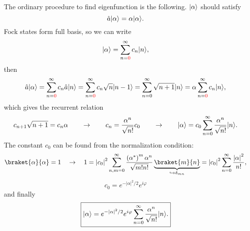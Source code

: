 The ordinary procedure to find eigenfunction is the following. $\lvert\alpha\rangle$ should satisfy
\begin{equation}
	\hat{a} \lvert\alpha\rangle = \alpha \lvert\alpha\rangle.
\end{equation}
Fock states form full basis, so we can write
\begin{equation}
	\lvert\alpha\rangle = \sum_{n={\textcolor{red} 0}}^{\infty} c_n \lvert n\rangle,
\end{equation}
then
\begin{equation}
	\hat{a} \lvert\alpha\rangle = \sum_{n={\textcolor{red} 0}}^{\infty} c_n \hat{a} \lvert n\rangle = \sum_{n={\textcolor{red} 0}}^{\infty} c_n \sqrt{n} \lvert n-1\rangle = \sum_{n=0}^{\infty} \sqrt{n+1} \lvert n\rangle = \alpha \sum_{n={\textcolor{red} 0}}^{\infty} c_n \lvert n\rangle,
\end{equation}
which gives the recurrent relation
\begin{equation}
	c_{n+1} \sqrt{n+1} = c_n \alpha \qquad \to \qquad c_n = \frac{\alpha^n}{\sqrt{n!}} c_0 \qquad \to \qquad \lvert\alpha\rangle = c_0 \sum_{n=0}^{\infty} \frac{\alpha^n}{\sqrt{n!}} \lvert n\rangle.
\end{equation}
The constant $c_0$ can be found from the normalization condition:
\begin{equation}
	\braket{\alpha}{\alpha} = 1 \quad \to \quad 1 = \left|c_0\right|^2 \sum_{n,m = 0}^{\infty} \frac{\left( \alpha^* \right)^m \alpha^n}{\sqrt{m!n!}} \underbrace{\braket{m}{n}}_{\hookrightarrow  \delta_{mn}} = \left|c_0\right|^2 \sum_{n = 0}^{\infty} \frac{\left|\alpha\right|^2}{n!},
\end{equation}
\begin{equation}
	c_0 = e^{- \left|\alpha\right|^2/2} e^{i \varphi}
\end{equation}
and finally
\begin{equation}
	\boxed{\lvert\alpha\rangle = e^{- \left|\alpha\right|^2/2} e^{i \varphi} \sum_{n = 0}^{\infty} \frac{\alpha^n}{\sqrt{n!}} \lvert n\rangle.}
\end{equation}
